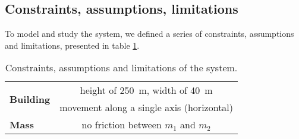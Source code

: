 \subsection{Constraints, assumptions, limitations}
To model and study the system, we defined a series of constraints, assumptions and limitations, presented in table \ref{tab:constraints_assumptions_limitations}.\par
\begin{table}[H]
    \centering
    \begin{tabular}{|l|c|}
        \hline
        \multirow{2}{*}{{\bf Building}} & height of \SI{250}{\meter}, width of \SI{40}{\meter}\\ & movement along a single axis (horizontal)\\\hline
        {\bf Mass} & no friction between $m_1$ and $m_2$\\ \hline
    \end{tabular}
    \caption{Constraints, assumptions and limitations of the system.}
    \label{tab:constraints_assumptions_limitations}
\end{table}
